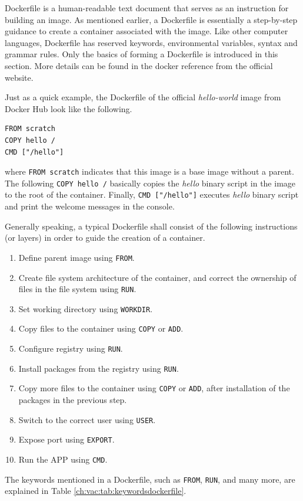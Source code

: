 Dockerfile is a human-readable text document that serves as an instruction for building an image. As mentioned earlier, a Dockerfile is essentially a step-by-step guidance to create a container associated with the image. Like other computer languages, Dockerfile has reserved keywords, environmental variables, syntax and grammar rules. Only the basics of forming a Dockerfile is introduced in this section. More details can be found in the docker reference from the official website.

Just as a quick example, the Dockerfile of the official \textit{hello-world} image from Docker Hub look like the following.
\begin{lstlisting}
FROM scratch
COPY hello /
CMD ["/hello"]
\end{lstlisting}
where \verb|FROM scratch| indicates that this image is a base image without a parent. The following \verb|COPY hello /| basically copies the \textit{hello} binary script in the image to the root of the container. Finally, \verb|CMD ["/hello"]| executes \textit{hello} binary script and print the welcome messages in the console.

Generally speaking, a typical Dockerfile shall consist of the following instructions (or layers) in order to guide the creation of a container.
\begin{enumerate}[(1)]
  \item Define parent image using \verb|FROM|.
  \item Create file system architecture of the container, and correct the ownership of files in the file system using \verb|RUN|.
  \item Set working directory using \verb|WORKDIR|.
  \item Copy files to the container using \verb|COPY| or \verb|ADD|.
  \item Configure registry using \verb|RUN|.
  \item Install packages from the registry using \verb|RUN|.
  \item Copy more files to the container using \verb|COPY| or \verb|ADD|, after installation of the packages in the previous step.
  \item Switch to the correct user using \verb|USER|.
  \item Expose port using \verb|EXPORT|.
  \item Run the APP using \verb|CMD|.
\end{enumerate}

The keywords mentioned in a Dockerfile, such as \verb|FROM|, \verb|RUN|, and many more, are explained in Table \ref{ch:vac:tab:keywordsdockerfile}.

